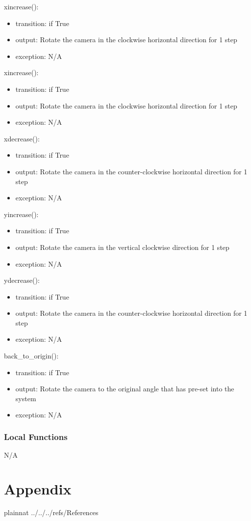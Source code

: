 \documentclass[12pt, titlepage]{article}
\begin{document}
\noindent xincrease():
\begin{itemize}
\item transition: if True 
\item output: Rotate the camera in the clockwise horizontal direction for 1 step 
\item exception: N/A 
\end{itemize}


\noindent xincrease():
\begin{itemize}
\item transition: if True 
\item output: Rotate the camera in the clockwise horizontal direction for 1 step 
\item exception: N/A 
\end{itemize}

\noindent xdecrease():
\begin{itemize}
\item transition: if True 
\item output: Rotate the camera in the counter-clockwise horizontal direction for 1 step 
\item exception: N/A 
\end{itemize}

\noindent yincrease():
\begin{itemize}
\item transition: if True 
\item output: Rotate the camera in the vertical clockwise direction for 1 step
\item exception: N/A 
\end{itemize}

\noindent ydecrease():
\begin{itemize}
\item transition: if True 
\item output: Rotate the camera in the counter-clockwise horizontal direction for 1 step 
\item exception: N/A 
\end{itemize}

\noindent back\_to\_origin():
\begin{itemize}
\item transition: if True 
\item output: Rotate the camera to the original angle that has pre-set into the system
\item exception: N/A 
\end{itemize}




\subsubsection{Local Functions}

N/A

\newpage





\section{Appendix} \label{Appendix}



\newpage

 {plainnat}
 {../../../refs/References}

\newpage
\end{document}
